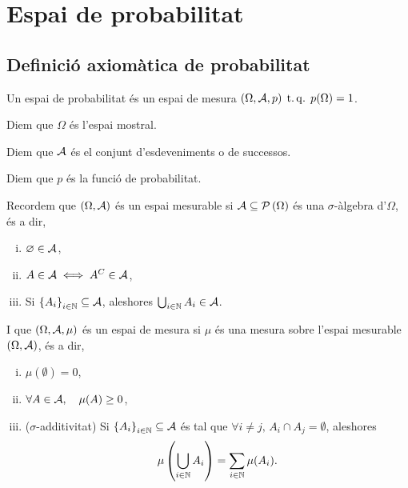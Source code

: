 \chapter{Espai de probabilitat}

\section{Definició axiomàtica de probabilitat}

\begin{defi}
    Un espai de probabilitat és un espai de mesura $(\Omega,\mathcal{A}, p) \operatorname{\;t.q.\;} p(\Omega)=1$.
\end{defi}

\begin{defi}
    Diem que $\Omega$ és l'espai mostral.
\end{defi}

\begin{defi}
    Diem que $\mathcal{A}$ és el conjunt d'esdeveniments o de successos.
\end{defi}

\begin{defi}
    Diem que $p$ és la funció de probabilitat.
\end{defi}

\begin{obs}
    Recordem que $\left(\Omega,\mathcal{A}\right)$ és un espai mesurable si $\mathcal{A}\subseteq \mathcal{P}\left(\Omega\right)$ és una $\sigma$-àlgebra d'$\Omega$, és a dir,
    \begin{enumerate}[i)]
        \item $\varnothing \in \mathcal{A}$,
        \item $A \in \mathcal{A} \iff A^C \in \mathcal{A}$,
        \item Si $\left\{ A_i\right\} _{i\in\mathbb{N}}\subseteq \mathcal{A}$, aleshores $\bigcup_{i\in\mathbb{N}}{A_i} \in \mathcal{A}$.
    \end{enumerate}
    I que $\left(\Omega,\mathcal{A},\mu\right)$ és un espai de mesura si $\mu$ és una mesura sobre l'espai mesurable $\left(\Omega,\mathcal{A}\right)$, és a dir,
    \begin{enumerate}[i)]
        \item $\mu(\emptyset) = 0$,
        \item $\forall A \in \mathcal{A},\quad \mu(A) \ge0$,
        \item ($\sigma$-additivitat) Si $\left\{ A_i\right\}_{i\in\mathbb{N}}\subseteq\mathcal{A}$ és tal que $\forall i \neq j, \, A_i \cap A_j = \emptyset$,
        aleshores 
        \[
            \mu\left(\bigcup_{i\in\mathbb{N}}{A_i}\right) = \sum_{i\in\mathbb{N}}{\mu(A_i)}.
        \]
    \end{enumerate}
\end{obs}

